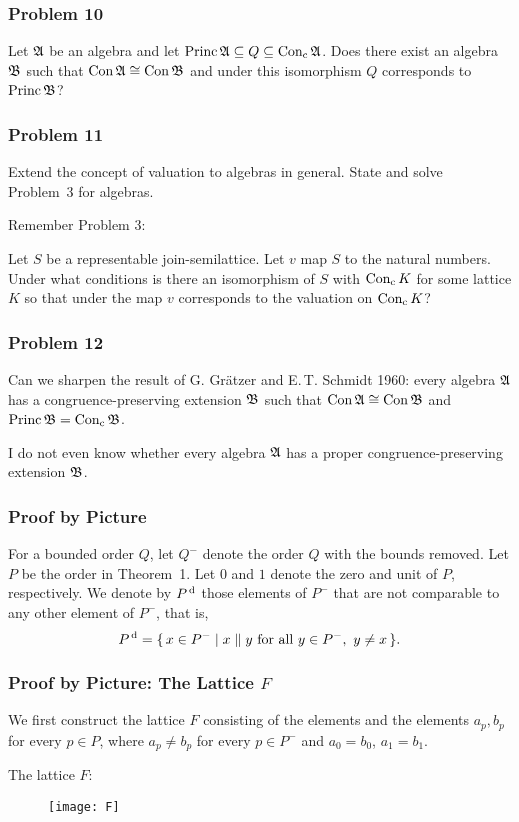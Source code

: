 \documentclass[leqno]{beamer}
\DeclareMathOperator{\Princ}{Princ}
\DeclareMathOperator{\Conc}{\tup{Con}_\tup{c}}
\newcommand{\Pd}{P^{\,\tup{d}}}
\begin{document}
\begin{frame}
\frametitle{Problem 10}

\begin{problem}
Let  $\mathfrak{A}$ be an algebra
and let $\Princ \F A \ci Q \ci \Conc \F A$. 
Does there exist an algebra $\mathfrak{B}$ such that
$\operatorname{Con} \mathfrak{A} \cong \operatorname{Con} \mathfrak{B}$ and under this isomorphism
$Q$ corresponds to $\Princ \F B$? 
\end{problem}
\end{frame}

\begin{frame}
\frametitle{Problem 11}

\begin{problem}
Extend the concept of valuation to algebras in general.
State and solve Problem~3 for algebras.
\end{problem}

\pause

Remember Problem 3:

\begin{problem}
Let $S$ be a representable join-semilattice. 
Let $v$ map $S$ to the natural numbers.
Under what conditions is there an isomorphism \gf
of $S$ with $\Conc K$ for some lattice $K$
so that under \gf the map $v$ corresponds 
to the valuation on $\Conc K$?
\end{problem}
\end{frame}

\begin{frame}
\frametitle{Problem 12}

\begin{problem}
Can we sharpen the result of 
G. Gr\"atzer and E.\,T. Schmidt 1960:
every algebra $\mathfrak{A}$ 
has a congruence-preserving extension $\mathfrak{B}$
such that $\operatorname{Con} \mathfrak{A} \cong \operatorname{Con} \mathfrak{B}$  
and $\Princ \F B = \Conc {\F B}$.
\end{problem}
\pause
I do not even know whether every algebra $\mathfrak{A}$ has a 
proper congruence-preserving extension $\mathfrak{B}$.
\end{frame}

\begin{frame}
\frametitle{Proof by Picture}
For a bounded order $Q$, 
let $Q^-$ denote the order $Q$ with the bounds removed.
Let $P$ be the order in Theorem~1. 
Let $0$ and $1$ denote the zero and unit of $P$, respectively.
We denote by $\Pd$ those elements of $P^-$ that are not comparable to any other element of $P^-$, that is,
\[
   \Pd = \setm{x \in P^-}{ x \parallel y 
      \text{ for all } y \in P^-,\ y \neq x}.
\]

\end{frame}
\begin{frame}
\frametitle{Proof by Picture: The Lattice $F$}
We first construct the lattice $F$
consisting of the elements  
and the elements $a_p, b_p$ for every $p \in P$,
where $a_p \neq b_p$ for every $p \in P^-$
and $a_0 = b_0$, $a_1 = b_1$.  

The lattice $F$:
\begin{figure}[h!]
\centerline{\texttt{[image: F]}}
\end{figure}


\end{frame}
\end{document}
